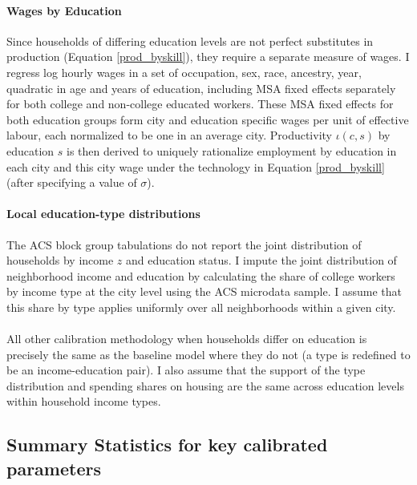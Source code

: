 \documentclass[12pt]{article}
\begin{document}
	\paragraph*{Wages by Education} Since households of differing education levels are not perfect substitutes in production (Equation \ref{prod_byskill}), they require a separate measure of wages. I regress log hourly wages in a set of occupation, sex, race, ancestry, year, quadratic in age and years of education, including MSA fixed effects separately for both college and non-college educated workers. These MSA fixed effects for both education groups form city and education specific wages per unit of effective labour, each normalized to be one in an average city. Productivity $\iota(c, s)$ by education $s$ is then derived to uniquely rationalize employment by education in each city and this city wage under the technology in Equation \eqref{prod_byskill} (after specifying a value of $\sigma$).
	
	\paragraph*{Local education-type distributions} The ACS block group tabulations do not report the joint distribution of households by income $z$ and education status. I impute the joint distribution of neighborhood income and education by calculating the share of college workers by income type at the city level using the ACS microdata sample. I assume that this share by type applies uniformly over all neighborhoods within a given city. 
	
	\paragraph*{}
	All other calibration methodology when households differ on education is precisely the same as the baseline model where they do not (a type is redefined to be an income-education pair). I also assume that the support of the type distribution and spending shares on housing are the same across education levels within household income types. 
	
	
	
	\clearpage
	
	\subsection{Summary Statistics for key calibrated parameters}\label{Appendix:CalibPara}
	
\end{document}
